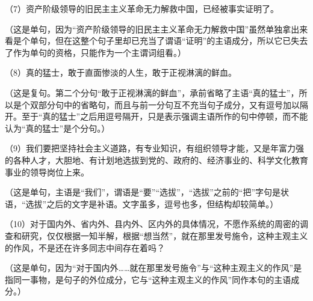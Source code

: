 （7）资产阶级领导的旧民主主义革命无力解救中国，已经被事实证明了。

（这是单句，因为“资产阶级领导的旧民主主义革命无力解救中国”虽然单独拿出来看是个单句，但在这整个句子里却已充当了谓语“证明”的主语成分，所以它已失去了作为单句的资格，只能作为一个主谓词组看。）

（8）真的猛士，敢于直面惨淡的人生，敢于正视淋漓的鲜血。

（这是复句。第二个分句“敢于正视淋漓的鲜血”，承前省略了主语“真的猛士”，所以是个双部分句中的省略句，而且与前一分句互不充当句子成分，又有逗号加以隔开。至于“真的猛士”之后用逗号隔开，只是表示强调主语所作的句中停顿，而不能认为“真的猛士”是个分句。）

（9）我们要把坚持社会主义道路，有专业知识，有组织领导才能，又是年富力强的各种人才，大胆地、有计划地选拔到党的、政府的、经济事业的、科学文化教育事业的领导岗位上来。

（这是单句，主语是“我们”，谓语是“要”“选拔”，“选拔”之前的“把”字句是状语，“选拔”之后的文字是补语。文字虽多，逗号也多，但结构却较简单。）

（10）对于国内外、省内外、县内外、区内外的具体情况，不愿作系统的周密的调查和研究，仅仅根据一知半解，根据“想当然”，就在那里发号施令，这种主观主义的作风，不是还在许多同志中间存在着吗？

（这是单句，因为“对于国内外……就在那里发号施令”与“这种主观主义的作风”是指同一事物，是句子的外位成分，它与“这种主观主义的作风”同作本句的主语成分。）
\newpage